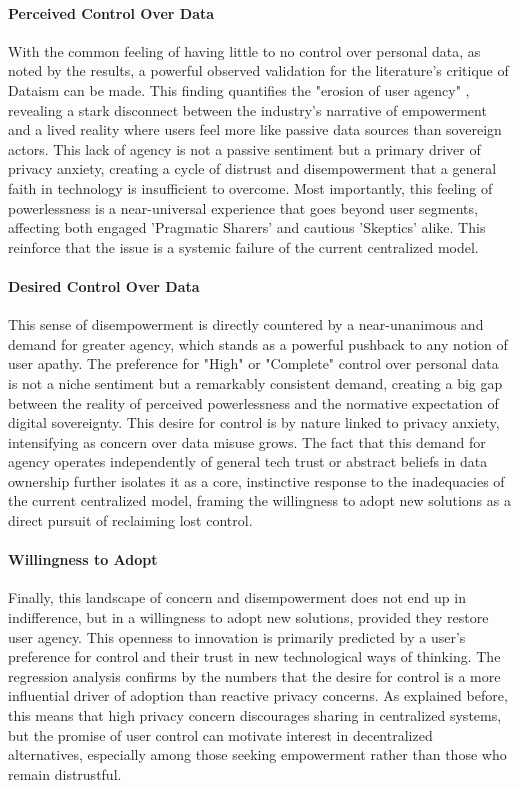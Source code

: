 	\paragraph{Perceived Control Over Data}
	With the common feeling of having little to no control over personal data, as noted by the results, a powerful observed validation for the literature's critique of Dataism can be made. This finding quantifies the "erosion of user agency" \cite{VanDijck2014}, revealing a stark disconnect between the industry's narrative of empowerment and a lived reality where users feel more like passive data sources than sovereign actors. This lack of agency is not a passive sentiment but a primary driver of privacy anxiety, creating a cycle of distrust and disempowerment that a general faith in technology is insufficient to overcome. Most importantly, this feeling of powerlessness is a near-universal experience that goes beyond user segments, affecting both engaged 'Pragmatic Sharers' and cautious 'Skeptics' alike. This reinforce that the issue is a systemic failure of the current centralized model.

	\paragraph{Desired Control Over Data}
	This sense of disempowerment is directly countered by a near-unanimous and demand for greater agency, which stands as a powerful pushback to any notion of user apathy. The preference for "High" or "Complete" control over personal data is not a niche sentiment but a remarkably consistent demand, creating a big gap between the reality of perceived powerlessness and the normative expectation of digital sovereignty. This desire for control is by nature linked to privacy anxiety, intensifying as concern over data misuse grows. The fact that this demand for agency operates independently of general tech trust or abstract beliefs in data ownership further isolates it as a core, instinctive response to the inadequacies of the current centralized model, framing the willingness to adopt new solutions as a direct pursuit of reclaiming lost control.

	\paragraph{Willingness to Adopt}
	Finally, this landscape of concern and disempowerment does not end up in indifference, but in a willingness to adopt new solutions, provided they restore user agency. This openness to innovation is primarily predicted by a user's preference for control and their trust in new technological ways of thinking. The regression analysis confirms by the numbers that the desire for control is a more influential driver of adoption than reactive privacy concerns. As explained before, this means that high privacy concern discourages sharing in centralized systems, but the promise of user control can motivate interest in decentralized alternatives, especially among those seeking empowerment rather than those who remain distrustful. 
